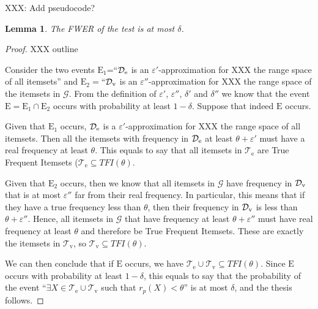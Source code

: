 \documentclass{article}
\newcommand{\Ds}{{\cal D}}
\newtheorem{lemma}{Lemma}
\begin{document}
XXX: Add pseudocode?

\begin{lemma}
  The FWER of the test is at most $\delta$.
\end{lemma}

\begin{proof}
  XXX outline

  Consider the two events $\mathrm{E}_1$=``$\Ds_\mathrm{e}$ is an
  $\varepsilon'$-approximation for XXX the range space of all itemsets'' and $\mathrm{E}_2=$``$\Ds_\mathrm{v}$ is an
  $\varepsilon''$-approximation for XXX the range space of the itemsets in $\mathcal{G}$. From
  the definition of $\varepsilon'$, $\varepsilon''$, $\delta'$ and $\delta''$ we
  know that the event $\mathrm{E}=\mathrm{E}_1\cap\mathrm{E}_2$ occurs with probability at
  least $1-\delta$. Suppose that indeed $\mathrm{E}$ occurs.

  Given that $\mathrm{E}_1$ occurs, $\Ds_\mathrm{e}$ is a
  $\varepsilon'$-approximation for XXX the range space of all itemsets. Then all
  the itemsets with frequency in $\Ds_\mathrm{e}$ at least $\theta+\varepsilon'$
  must have a real frequency at least $\theta$. This equals to say that all
  itemsets in $\mathcal{T}_\mathrm{e}$ are True Frequent Itemsets
  ($\mathcal{T}_\mathrm{e}\subseteq TFI(\theta)$.

  Given that $\mathrm{E}_2$ occurs, then we know that all itemsets in
  $\mathcal{G}$ have frequency in $\Ds_\mathrm{v}$ that is at most
  $\varepsilon''$ far from their real frequency. In particular, this means that
  if they have a true frequency less than $\theta$, then their frequency in
  $\Ds_\mathrm{v}$ is less than $\theta+\varepsilon''$. Hence, all itemsets in
  $\mathcal{G}$ that have frequency at least $\theta+\varepsilon''$ must have
  real frequency at least $\theta$ and therefore be True Frequent Itemsets.
  These are exactly the itemsets in $\mathcal{T}_\mathrm{v}$, so
  $\mathcal{T}_\mathrm{v}\subseteq TFI(\theta)$. 

  We can then conclude that if $\mathrm{E}$ occurs, we have
  $\mathcal{T}_\mathrm{e}\cup \mathcal{T}_\mathrm{v}\subseteq TFI(\theta)$.
  Since $\mathrm{E}$ occurs with probability at least $1-\delta$, this equals to
  say that the probability of the event ``$\exists X\in\mathcal{T}_\mathrm{e}\cup
  \mathcal{T}_\mathrm{v}$ such that $r_p(X)<\theta$'' is at most $\delta$, and
  the thesis follows.
 \end{proof}
\end{document}
